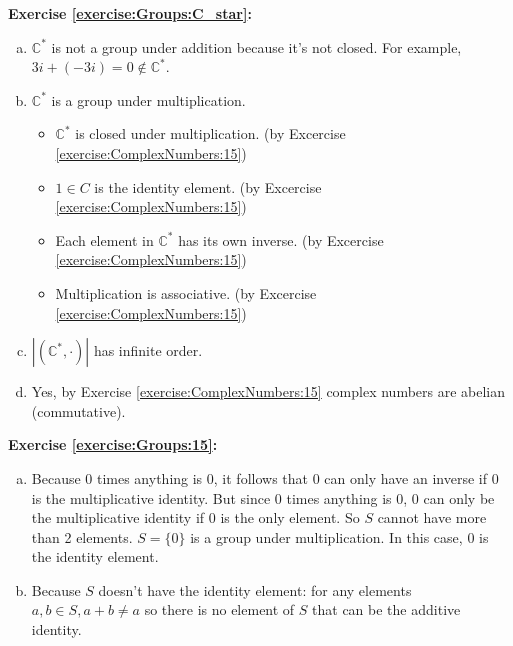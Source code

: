 \noindent\textbf{Exercise \ref{exercise:Groups:C_star}:}
\begin{enumerate}[(a)]
\item
${\mathbb C}^{\ast}$ is not a group under addition because it's not closed. For example, 
$3i + (-3i) = 0 \not\in {\mathbb C}^{\ast}$.

\item
${\mathbb C}^{\ast}$ is a group under multiplication.
	
	\begin{itemize}
	\item
	${\mathbb C}^{\ast}$ is closed under multiplication. \quad \quad (by Excercise \ref{exercise:ComplexNumbers:15})

	\item
	$1 \in C$ is the identity element. \quad \quad (by Excercise \ref{exercise:ComplexNumbers:15})

	\item
	Each element in ${\mathbb C}^{\ast}$ has its own inverse. \quad \quad (by Excercise \ref{exercise:ComplexNumbers:15})

	\item
	Multiplication is associative. \quad \quad (by Excercise \ref{exercise:ComplexNumbers:15})
	\end{itemize}
	
\item
$|({\mathbb C}^{\ast}, \cdot)|$ has infinite order.

\item
Yes, by Exercise \ref{exercise:ComplexNumbers:15} complex numbers are abelian (commutative).
\end{enumerate} 

\noindent\textbf{Exercise \ref{exercise:Groups:15}:}
\begin{enumerate}[(a)]
\item
Because 0 times anything is 0, it follows that 0 can only have an inverse if 0 is the multiplicative identity. But since 0 times anything is 0, 0 can only be the multiplicative identity if 0 is the only element. So $S$ cannot have more than 2 elements.
 $S = \{0\}$ is a group under multiplication. In this case, $0$ is the identity element.

\item
Because $S$ doesn't have the identity element: for any elements $a,b \in S, a+b \neq a$ so there is no element of $S$ that can be the additive identity.
\end{enumerate}

